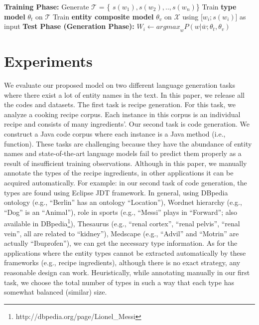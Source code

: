 \documentclass[11pt,a4paper]{article}
\begin{document}
\begin{algorithm}[t]
\DontPrintSemicolon
{}
\vspace{5pt}
 {\bf Training Phase: \;}{
 Generate $\mathcal{T}$ = \{ $s(w_1), s(w_2), .., s(w_n)$\}\;
 Train \textbf{type model} $\theta_t$ on $\mathcal{T}$\;
 Train \textbf{entity composite model} $\theta_v$ on $\mathcal{X}$ using  [$w_i; s(w_i)$] as input\;
 }
 \vspace{5pt}
 {\bf Test Phase (Generation Phase):\;} {
  {
  $W_i \gets {argmax}_w P(w| \bar{w}; \theta_t, \theta_v)$ \;
  }
 }
 \caption{\textbf{\small Language Generation}}
 \label{algo-1}
\end{algorithm}









\section{Experiments}
\label{experiments}

We evaluate our proposed model on two different language generation tasks where there exist a lot of entity names in the text. In this paper, we release all the codes and datasets.
The first task is recipe generation. For this task, we analyze a cooking recipe corpus. Each instance in this corpus is an individual recipe and 
consists of 
many ingredients'.
Our second task is code generation. We construct a Java code corpus where each instance is a Java method (i.e., function). 
These tasks are challenging because they have the abundance of entity names and state-of-the-art language models fail to predict them properly as a result of insufficient training observations.  Although in this paper, we manually annotate the types of the recipe ingredients, in other applications it can be acquired automatically.  For example: in our second task of code generation, the types are found using Eclipse JDT framework. In general, using DBpedia ontology (e.g., ``Berlin'' has an ontology ``Location''), Wordnet hierarchy (e.g., ``Dog'' is an ``Animal''), role in sports (e.g., ``Messi'' plays in ``Forward''; also available in DBpedia\footnote{ http://dbpedia.org/page/Lionel\_Messi}), Thesaurus (e.g., ``renal cortex'', ``renal pelvis'', ``renal vein'', all are related to ``kidney''), Medscape (e.g., ``Advil'' and ``Motrin'' are actually ``Ibuprofen''), we can get the necessary type information. As for the applications where the entity types cannot be extracted automatically by these frameworks (e.g., recipe ingredients), although there is no exact strategy, any reasonable design can work. Heuristically, while annotating manually in our first task, we choose the total number of types in such a way that each type has somewhat balanced (similar) size. 
\end{document}

